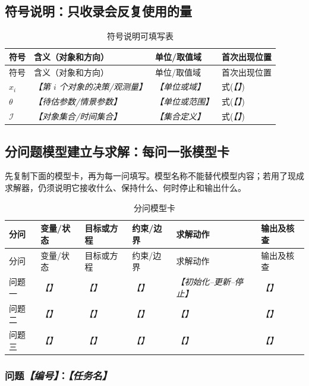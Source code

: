\documentclass[UTF8,zihao=-4]{ctexart}
\newcommand{\slot}[1]{\textcolor{inkblue}{\textit{【#1】}}}
\begin{document}
\subsection{符号说明：只收录会反复使用的量}

\begin{longtable}{p{2.2cm}p{7.0cm}p{2.2cm}p{3.3cm}}
\caption{符号说明可填写表}\label{tab:template-symbol-ledger}\\
\toprule
符号 & 含义（对象和方向） & 单位/取值域 & 首次出现位置\\
\midrule
\endfirsthead
\toprule
符号 & 含义（对象和方向） & 单位/取值域 & 首次出现位置\\
\midrule
\endhead
$x_i$ & \slot{第 $i$ 个对象的决策/观测量} & \slot{单位或域} & 式(\slot{})\\
$\theta$ & \slot{待估参数/情景参数} & \slot{单位或范围} & 式(\slot{})\\
$\mathcal{I}$ & \slot{对象集合/时间集合} & \slot{集合定义} & 式(\slot{})\\
\bottomrule
\end{longtable}

\subsection{分问题模型建立与求解：每问一张模型卡}

先复制下面的模型卡，再为每一问填写。模型名称不能替代模型内容；若用了现成求解器，仍须说明它接收什么、保持什么、何时停止和输出什么。

\begin{longtable}{p{1.8cm}p{2.4cm}p{2.7cm}p{2.7cm}p{2.8cm}p{2.1cm}}
\caption{分问模型卡}\label{tab:template-model-card}\\
\toprule
分问 & 变量/状态 & 目标或方程 & 约束/边界 & 求解动作 & 输出及核查\\
\midrule
\endfirsthead
\toprule
分问 & 变量/状态 & 目标或方程 & 约束/边界 & 求解动作 & 输出及核查\\
\midrule
\endhead
问题一 & \slot{} & \slot{} & \slot{} & \slot{初始化--更新--停止} & \slot{}\\
问题二 & \slot{} & \slot{} & \slot{} & \slot{} & \slot{}\\
问题三 & \slot{} & \slot{} & \slot{} & \slot{} & \slot{}\\
\bottomrule
\end{longtable}

\subsubsection*{问题\slot{编号}：\slot{任务名}}
\end{document}
